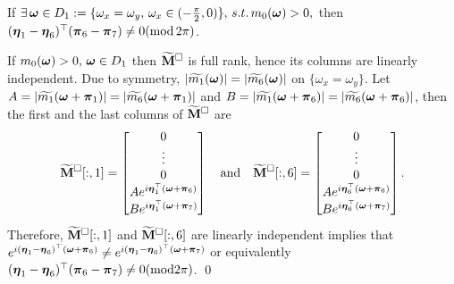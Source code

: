 \begin{lemma}
If $\exists\,\boldsymbol{\omega}\in D_1:=\{\omega_x=\omega_y,\,\omega_x\in(-\frac{\pi}{2},0)\},\,s.t. \,m_0(\boldsymbol{\omega})>0,$ then $(\boldsymbol{\eta}_1-\boldsymbol{\eta}_6)^\top (\boldsymbol{\pi}_6-\boldsymbol{\pi}_7)\neq 0(\text{mod}\,2\pi)$. 
\end{lemma} 
  If $m_0(\boldsymbol{\omega})>0, \,\boldsymbol{\omega}\in D_1$ then $\widetilde{\mathbf{M}}^{\Box}$ is full rank, hence its columns are linearly independent. Due to symmetry, $|\widetilde{m_1}(\boldsymbol{\omega})| = |\widetilde{m_6}(\boldsymbol{\omega})|$ on $\{\omega_x=\omega_y\}$. Let $A = |\widetilde{m_1}(\boldsymbol{\omega}+\boldsymbol{\pi}_1)| = |\widetilde{m_6}(\boldsymbol{\omega}+\boldsymbol{\pi}_1)|$ and $B=|\widetilde{m_1}(\boldsymbol{\omega}+\boldsymbol{\pi}_6)| = |\widetilde{m_6}(\boldsymbol{\omega}+\boldsymbol{\pi}_6)|$, then the first and the last columns of $\widetilde{\mathbf{M}}^{\Box}$ are
  \begin{align*}
  \widetilde{\mathbf{M}}^{\Box}[:,1] = 
 \begin{bmatrix}
 0\\
 \vdots\\
 0\\
 Ae^{i\boldsymbol{\eta}_1^\top(\boldsymbol{\omega}+\boldsymbol{\pi}_6)}\\
 Be^{i\boldsymbol{\eta}_1^\top(\boldsymbol{\omega}+\boldsymbol{\pi}_7)}
 \end{bmatrix}
 \quad\text{and}\quad
  \widetilde{\mathbf{M}}^{\Box}[:,6] = 
 \begin{bmatrix}
 0\\
 \vdots\\
 0\\
 Ae^{i\boldsymbol{\eta}_6^\top(\boldsymbol{\omega}+\boldsymbol{\pi}_6)}\\
 Be^{i\boldsymbol{\eta}_6^\top(\boldsymbol{\omega}+\boldsymbol{\pi}_7)}
 \end{bmatrix} .
\end{align*}   
Therefore, $\widetilde{\mathbf{M}}^{\Box}[:,1]$ and $\widetilde{\mathbf{M}}^{\Box}[:,6]$ are linearly independent implies that $e^{i(\boldsymbol{\eta}_1-\boldsymbol{\eta}_6)^\top(\boldsymbol{\omega}+\boldsymbol{\pi}_6)}\neq e^{i(\boldsymbol{\eta}_1-\boldsymbol{\eta}_6)^\top(\boldsymbol{\omega}+\boldsymbol{\pi}_7)}$ or equivalently $(\boldsymbol{\eta}_1-\boldsymbol{\eta}_6)^\top(\boldsymbol{\pi}_6-\boldsymbol{\pi}_7)\neq 0(\text{mod}2\pi)$. \qed\\

